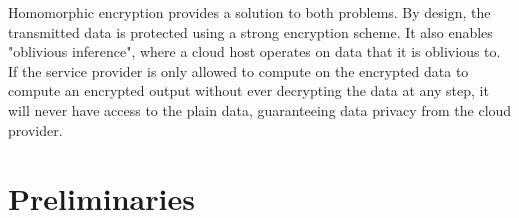 \documentclass[conference]{IEEEtran}
\begin{document}
Homomorphic encryption provides a solution to both problems.  By design, the transmitted data is protected using a strong encryption scheme.  It also enables "oblivious inference", where a cloud host operates on data that it is oblivious to.  If the service provider is only allowed to compute on the encrypted data to compute an encrypted output without ever decrypting the data at any step, it will never have access to the plain data, guaranteeing data privacy from the cloud provider.

\section{Preliminaries}\label{sec:prelim}






\end{document}
